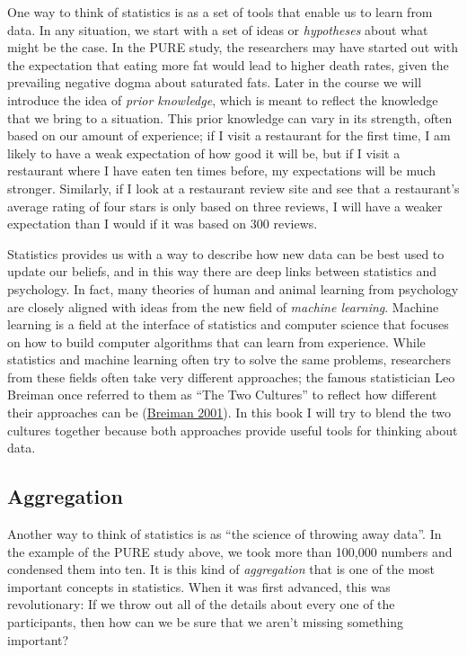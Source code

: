 \documentclass[
  12pt,
]{book}
\begin{document}
One way to think of statistics is as a set of tools that enable us to learn from data. In any situation, we start with a set of ideas or \emph{hypotheses} about what might be the case. In the PURE study, the researchers may have started out with the expectation that eating more fat would lead to higher death rates, given the prevailing negative dogma about saturated fats. Later in the course we will introduce the idea of \emph{prior knowledge}, which is meant to reflect the knowledge that we bring to a situation. This prior knowledge can vary in its strength, often based on our amount of experience; if I visit a restaurant for the first time, I am likely to have a weak expectation of how good it will be, but if I visit a restaurant where I have eaten ten times before, my expectations will be much stronger. Similarly, if I look at a restaurant review site and see that a restaurant's average rating of four stars is only based on three reviews, I will have a weaker expectation than I would if it was based on 300 reviews.

Statistics provides us with a way to describe how new data can be best used to update our beliefs, and in this way there are deep links between statistics and psychology. In fact, many theories of human and animal learning from psychology are closely aligned with ideas from the new field of \emph{machine learning}. Machine learning is a field at the interface of statistics and computer science that focuses on how to build computer algorithms that can learn from experience. While statistics and machine learning often try to solve the same problems, researchers from these fields often take very different approaches; the famous statistician Leo Breiman once referred to them as ``The Two Cultures'' to reflect how different their approaches can be (\protect\hyperlink{ref-breiman2001}{Breiman 2001}). In this book I will try to blend the two cultures together because both approaches provide useful tools for thinking about data.

\hypertarget{aggregation}{%
\subsection{Aggregation}\label{aggregation}}

Another way to think of statistics is as ``the science of throwing away data''. In the example of the PURE study above, we took more than 100,000 numbers and condensed them into ten. It is this kind of \emph{aggregation} that is one of the most important concepts in statistics. When it was first advanced, this was revolutionary: If we throw out all of the details about every one of the participants, then how can we be sure that we aren't missing something important?
\end{document}
